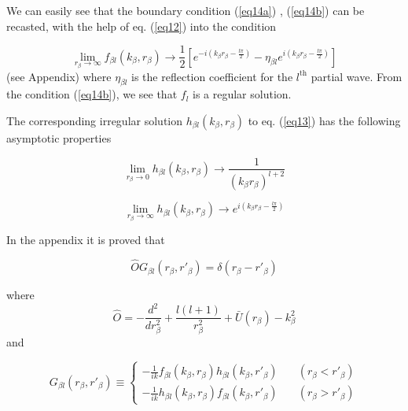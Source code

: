 \documentclass[a4paper,14pt]{book}
\begin{document}
We can easily see that the boundary condition (\ref{eq14a}) , (\ref{eq14b}) can be recasted, with the help of eq. (\ref{eq12}) into the condition

 \begin{equation}\label{eq15}
\lim_{r_\beta \rightarrow \infty} f_{\beta l}( k_ \beta, r_ \beta) \longrightarrow
\frac{1}{2}\left[ e^{-i  (k_ \beta r_ \beta -\frac{l\pi}{2})}-\eta_{\beta l}e^{i  (k_ \beta r_ \beta -\frac{l\pi}{2})}\right]
\end{equation}
(see Appendix)
where $\eta_{\beta l}$ is the reflection coefficient for the $l^{\text{th}}$ partial wave. From the condition (\ref{eq14b}), we see that $f_l$ is a regular solution.


The corresponding irregular solution $h_{\beta l}( k_ \beta, r_ \beta)$ to eq. (\ref{eq13}) has the following asymptotic properties


 \begin{equation}\label{eq16}
\lim_{r_\beta \rightarrow 0} h_{\beta l}( k_ \beta, r_ \beta) \longrightarrow
\frac{1}{(k_ \beta r_ \beta)^{l+2}}
\end{equation}

 \begin{equation}\label{eq17}
\lim_{r_\beta \rightarrow \infty} h_{\beta l}( k_ \beta, r_ \beta) \longrightarrow
e^{i(k_ \beta r_ \beta -\frac{l\pi}{2})}
\end{equation}

In the appendix it is proved that

 \begin{equation}\label{eq18}
\hat O G_{\beta l} ( r_ \beta, r'_ \beta)=\delta(r_ \beta-r'_ \beta)
\end{equation}

where
 \begin{equation}\label{eq19}
\hat O=-\frac{d^2}{dr^2_\beta}+\frac{l(l+1)}{r^2_\beta}+\bar U (r_ \beta)-k_\beta^2
\end{equation}
and

 \begin{equation}\label{eq20}
G_{\beta l} ( r_ \beta, r'_ \beta) \equiv \left \lbrace \begin{aligned}
-\frac{1}{ik} f_{\beta l}( k_ \beta, r_ \beta) h_{\beta l}( k_ \beta, r'_ \beta) &\quad( r_ \beta< r'_ \beta)\\
-\frac{1}{ik} h_{\beta l}( k_ \beta, r_ \beta) f_{\beta l}( k_ \beta, r'_ \beta) &\quad( r_ \beta>r'_ \beta)
\end{aligned}
\right.
\end{equation}
\end{document}

